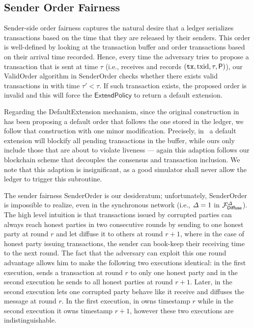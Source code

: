 \subsection{Sender Order Fairness}
\label{subsec:sender-order-fairness}

Sender-side order fairness captures the natural desire that a ledger \funcFairLedger serializes transactions based on the time that they are released by their senders.
%
This order is well-defined by looking at the \funcFairLedger transaction buffer and order transactions based on their arrival time recorded.
%
Hence, every time the adversary tries to propose a transaction \tx that is sent at time $\tau$ (i.e., \funcFairLedger receives \tx and records $(\mathtt{tx}, \mathrm{txid}, \tau, \mathsf{P})$), our \textsf{ValidOrder} algorithm in \textsf{SenderOrder}  checks whether there exists valid transactions in \buffer with time $\tau' < \tau$.
%
If such transaction exists, the proposed order is invalid and this will force the $\mathsf{ExtendPolicy}$ to return a default extension.

Regarding the \textsf{DefaultExtension} mechanism, since the original construction in~\cite{C:BMTZ17} has been proposing a default order that follows the one stored in the ledger, we follow that construction with one minor modification.
%
Precisely, in~\cite{C:BMTZ17} a default extension will blockify all pending transactions in the buffer, while ours only include those that are about to violate liveness --- again this adaption follows our blockchain scheme that decouples the consensus and transaction inclusion.
%
We note that this adaption is insignificant, as a good simulator shall never allow the ledger to trigger this subroutine.



The sender fairness \textsf{SenderOrder} is our desideratum; unfortunately, \textsf{SenderOrder} is impossible to realize, even in the synchronous network (i.e., $\varDelta = 1$ in $\mathcal{F}_{\mathsf{Diffuse}}^\varDelta$).
%
The high level intuition is that transactions issued by corrupted parties can always reach honest parties in two consecutive rounds by sending to one honest party \party at round $r$ and let \party diffuse it to others at round $r + 1$, where in the case of honest party issuing transactions, the sender can book-keep their receiving time to the next round.
%
The fact that the adversary \adv can exploit this one round advantage allows him to make the following two executions identical: in the first execution, \adv sends a transaction \tx at round $r$ to only one honest party and in the second execution he sends \tx to all honest parties at round $r + 1$.
%
Later, in the second execution \adv lets one corrupted party behave like it receive and diffuses the message at round $r$.
%
In the first execution, \tx in \funcFairLedger owns timestamp $r$ while in the second execution it owns timestamp $r + 1$, however these two executions are indistinguishable.
